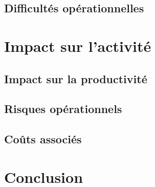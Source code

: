 
\subsection{Difficultés opérationnelles}


\section{Impact sur l'activité}


\subsection{Impact sur la productivité}


\subsection{Risques opérationnels}


\subsection{Coûts associés}


\section{Conclusion}

